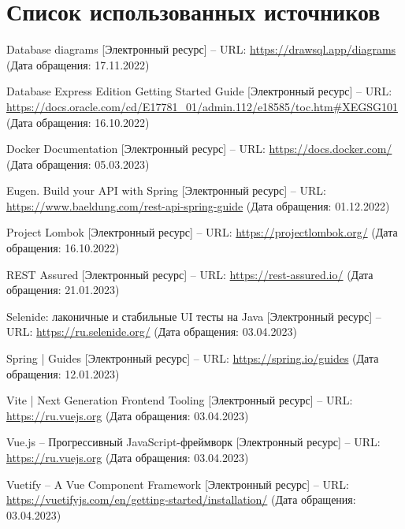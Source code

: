 \documentclass[a4paper,article]{article}
\begin{document}
\begin{sloppypar}
    \newpage

    \section*{Список использованных источников}

    \begin{enumerate}[leftmargin=*, itemindent=\labelwidth]
        
         Database diagrams [Электронный ресурс] -- URL: \url{https://drawsql.app/diagrams} (Дата обращения: 17.11.2022)
        
         Database Express Edition Getting Started Guide [Электронный ресурс] -- URL: \url{https://docs.oracle.com/cd/E17781_01/admin.112/e18585/toc.htm#XEGSG101} (Дата обращения: 16.10.2022)
        
         Docker Documentation [Электронный ресурс] -- URL: \url{https://docs.docker.com/} (Дата обращения: 05.03.2023)
        
         Eugen. Build your API with Spring [Электронный ресурс] -- URL: \url{https://www.baeldung.com/rest-api-spring-guide} (Дата обращения: 01.12.2022)
        
         Project Lombok [Электронный ресурс] -- URL: \url{https://projectlombok.org/} (Дата обращения: 16.10.2022)
        
         REST Assured [Электронный ресурс] -- URL: \url{https://rest-assured.io/} (Дата обращения: 21.01.2023)
        
         Selenide: лаконичные и стабильные UI тесты на Java [Электронный ресурс] -- URL: \url{https://ru.selenide.org/} (Дата обращения: 03.04.2023)
        
         Spring | Guides [Электронный ресурс] -- URL: \url{https://spring.io/guides} (Дата обращения: 12.01.2023)
        
         Vite | Next Generation Frontend Tooling [Электронный ресурс] -- URL: \url{https://ru.vuejs.org} (Дата обращения: 03.04.2023)
        
         Vue.js -- Прогрессивный JavaScript-фреймворк [Электронный ресурс] -- URL: \url{https://ru.vuejs.org} (Дата обращения: 03.04.2023)
        
         Vuetify -- A Vue Component Framework [Электронный ресурс] -- URL: \url{https://vuetifyjs.com/en/getting-started/installation/} (Дата обращения: 03.04.2023)
        

\end{enumerate}
\end{sloppypar}
\end{document}
